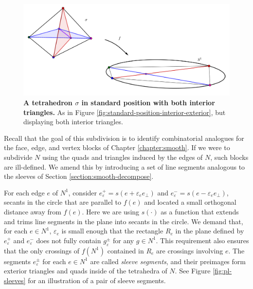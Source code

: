 \begin{figure}[h!]
	\centering
	\includegraphics[width=\textwidth]{figures/standard-position-interior-interior.png}
	\caption{
		\textbf{A tetrahedron $\sigma$ in standard position with both interior triangles.}
		As in Figure \ref{fig:standard-position-interior-exterior}, but displaying both interior triangles.
	}
	\label{fig:standard-position-interior-interior}
\end{figure}

Recall that the goal of this subdivision is to identify combinatorial analogues for the face, edge, and vertex blocks of Chapter \ref{chapter:smooth}.
If we were to subdivide $N$ using the quads and triangles induced by the edges of $N$, such blocks are ill-defined.
We amend this by introducing a set of line segments analogous to the sleeves of Section \ref{section:smooth-decompose}.

For each edge $e$ of $N^1$, consider $e_\varepsilon^+ = s(e+\varepsilon_e e_\perp)$ and $e_\varepsilon^- =s(e-\varepsilon_e e_\perp)$, secants in the circle that are parallel to $f(e)$ and located a small orthogonal distance away from $f(e)$.
Here we are using $s(\cdot)$ as a function that extends and trims line segments in the plane into secants in the circle.
We demand that, for each $e\in N^1$, $\varepsilon_e$ is small enough that the rectangle $R_e$ in the plane defined by $e_\varepsilon^+$ and $e_\varepsilon^-$ does not fully contain $g_\varepsilon^\pm$ for any $g\in N^1$.
This requirement also ensures that the only crossings of $f(N^1)$ contained in $R_e$ are crossings involving $e$.
The segments $e_\varepsilon^\pm$ for each $e\in N^1$ are called \emph{sleeve segments}, and their preimages form exterior triangles and quads inside of the tetrahedra of $N$.
See Figure \ref{fig:pl-sleeves} for an illustration of a pair of sleeve segments.

